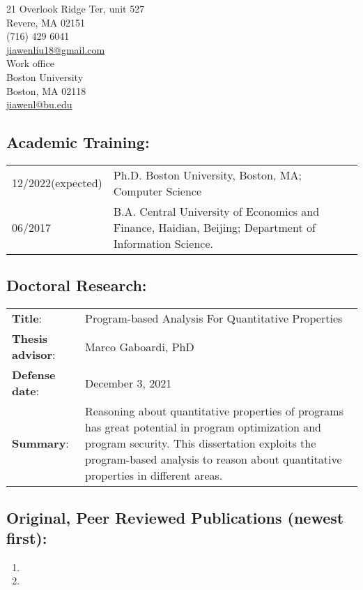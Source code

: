\documentclass[12pt, letterpaper]{report}   %
\begin{document}
\setlength{\columnsep}{1.5in}
\begin{multicols}{1}{
\begin{center}{
21 Overlook Ridge Ter, unit 527 \\ Revere, MA 02151 \\ (716) 429 6041 \\ \hyperlink{mailto:personaladdress@gmail.com}{jiawenliu18@gmail.com}\\
Work office \\Boston University \\ Boston, MA 02118 \\\hyperlink{mailto:buemail@bu.edu}{jiawenl@bu.edu}\\}
\end{center}}
\end{multicols}

\subsection*{Academic Training:}
\begin{tabular}{p{}p{}}
12/2022\small(expected) &  Ph.D. Boston University, Boston, MA; Computer Science\\
06/2017  & B.A. Central University of Economics and Finance, Haidian, Beijing; Department of Information Science. \\
\end{tabular}

\subsection*{Doctoral Research:}
\begin{tabular}{p{}p{}}
\textbf{Title}: & Program-based Analysis For Quantitative Properties \\
\textbf{Thesis advisor}: & Marco Gaboardi, PhD\\
\textbf{Defense date}: & December 3, 2021 \\
\textbf{Summary}: & Reasoning about quantitative properties of programs has great potential in program optimization and program security. This dissertation exploits the program-based analysis to reason about quantitative properties in different areas.
\\
\end{tabular}

\subsection*{Original, Peer Reviewed Publications (newest first):}
\begin{enumerate}
\item 
\item 
\end{enumerate}
\end{document}
